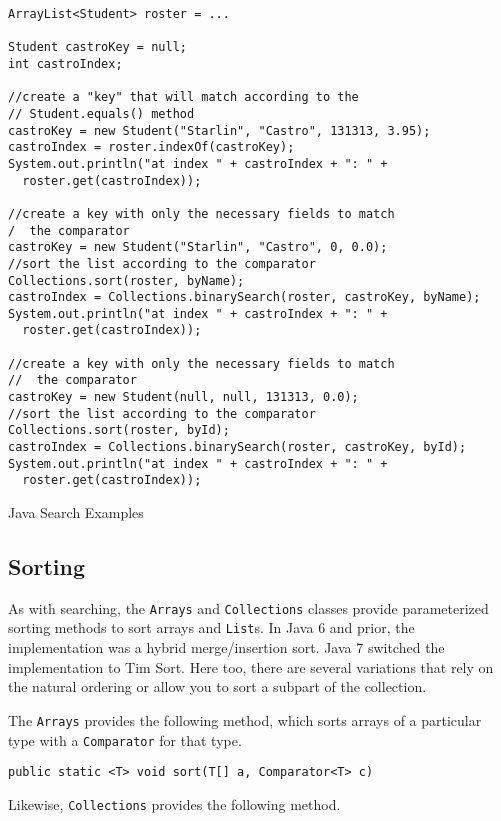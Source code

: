 \begin{listing}[!h]
\begin{verbatim}
ArrayList<Student> roster = ...
		
Student castroKey = null;
int castroIndex;
		
//create a "key" that will match according to the 
// Student.equals() method
castroKey = new Student("Starlin", "Castro", 131313, 3.95);
castroIndex = roster.indexOf(castroKey);
System.out.println("at index " + castroIndex + ": " + 
  roster.get(castroIndex));

//create a key with only the necessary fields to match 
/  the comparator
castroKey = new Student("Starlin", "Castro", 0, 0.0);
//sort the list according to the comparator
Collections.sort(roster, byName);
castroIndex = Collections.binarySearch(roster, castroKey, byName);
System.out.println("at index " + castroIndex + ": " + 
  roster.get(castroIndex));

//create a key with only the necessary fields to match 
//  the comparator
castroKey = new Student(null, null, 131313, 0.0);
//sort the list according to the comparator
Collections.sort(roster, byId);
castroIndex = Collections.binarySearch(roster, castroKey, byId);
System.out.println("at index " + castroIndex + ": " + 
  roster.get(castroIndex));
\end{verbatim}
\caption{Java Search Examples}
\label{code:java:searchExamples}
\end{listing}

\subsection{Sorting}

As with searching, the \texttt{Arrays} and 
\texttt{Collections} classes provide parameterized sorting 
methods to sort arrays and \texttt{List}s.  In Java 6 and prior, 
the implementation was a hybrid merge/insertion sort.  Java 7
switched the implementation to Tim Sort.  Here too, there are several 
variations that rely on the natural ordering or allow you to sort a 
subpart of the collection.

The \texttt{Arrays} provides the following method, which sorts 
arrays of a particular type with a \texttt{Comparator} for that type.

\texttt{public static <T> void sort(T[] a, Comparator<T> c)}

Likewise, \texttt{Collections} provides the following method.

